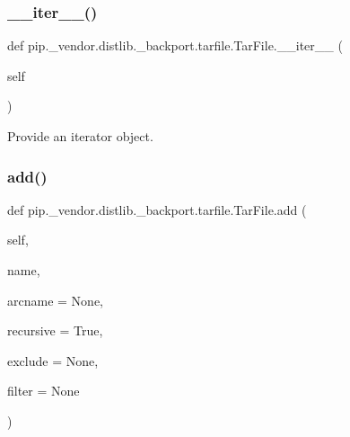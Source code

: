\subsubsection{\texorpdfstring{\+\_\+\+\_\+iter\+\_\+\+\_\+()}{\_\_iter\_\_()}}
{\footnotesize\ttfamily def pip.\+\_\+vendor.\+distlib.\+\_\+backport.\+tarfile.\+Tar\+File.\+\_\+\+\_\+iter\+\_\+\+\_\+ (\begin{DoxyParamCaption}\item[{}]{self }\end{DoxyParamCaption})}

\begin{DoxyVerb}Provide an iterator object.
\end{DoxyVerb}
 \mbox{\label{classpip_1_1__vendor_1_1distlib_1_1__backport_1_1tarfile_1_1TarFile_a79067a66314d66032cb43144c54355a2}} 
\subsubsection{\texorpdfstring{add()}{add()}}
{\footnotesize\ttfamily def pip.\+\_\+vendor.\+distlib.\+\_\+backport.\+tarfile.\+Tar\+File.\+add (\begin{DoxyParamCaption}\item[{}]{self,  }\item[{}]{name,  }\item[{}]{arcname = {\ttfamily None},  }\item[{}]{recursive = {\ttfamily True},  }\item[{}]{exclude = {\ttfamily None},  }\item[{}]{filter = {\ttfamily None} }\end{DoxyParamCaption})}

